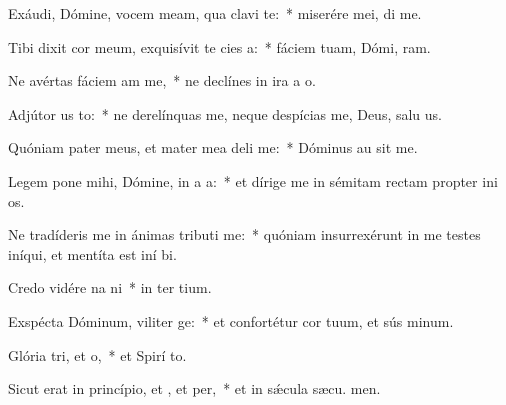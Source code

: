\item Exáudi, Dómine, vocem meam, qua clavi  te:~* miserére mei,  di me.
\item Tibi dixit cor meum, exquisívit te cies a:~* fáciem tuam, Dómi, ram.
\item Ne avértas fáciem am  me,~* ne declínes in ira a  o.
\item Adjútor us to:~* ne derelínquas me, neque despícias me, Deus, salu us.
\item Quóniam pater meus, et mater mea deli me:~* Dóminus au sit me.
\item Legem pone mihi, Dómine, in a a:~* et dírige me in sémitam rectam propter ini os.
\item Ne tradíderis me in ánimas tributi me:~* quóniam insurrexérunt in me testes iníqui, et mentíta est iní bi.
\item Credo vidére na ni~* in ter tium.
\item Exspécta Dóminum, viliter ge:~* et confortétur cor tuum, et sús minum.
\item Glória tri, et o,~* et Spirí to.
\item Sicut erat in princípio, et , et per,~* et in sǽcula sæcu. men.
